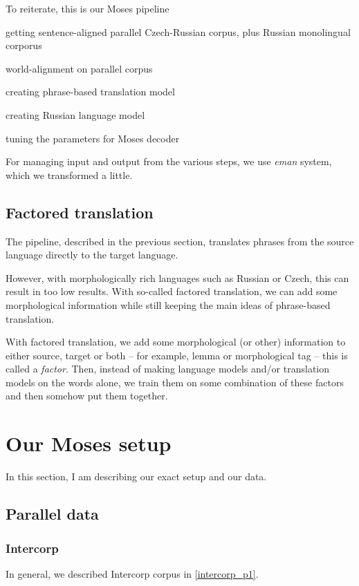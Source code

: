To reiterate, this is our Moses pipeline
\begin{pitemize}
\item getting sentence-aligned parallel Czech-Russian corpus, plus Russian monolingual corporus
\item world-alignment on parallel corpus
\item creating phrase-based translation model
\item creating Russian language model
\item tuning the parameters for Moses decoder
\end{pitemize}

For managing input and output from the various steps, we use \emph{eman} system, which we transformed a little.

\subsection{Factored translation}

The pipeline, described in the previous section, translates phrases from the source language directly to the target language.

However, with morphologically rich languages such as Russian or Czech, this can result in too low results. With so-called factored translation, we can add some morphological information while still keeping the main ideas of phrase-based translation.

With factored translation, we add some morphological (or other) information to either source, target or both -- for example, lemma or morphological tag -- this is called a \emph{factor}. Then, instead of making language models and/or translation models on the words alone, we train them on some combination of these factors and then somehow put them together.


\section{Our Moses setup}
In this section, I am describing our exact setup and our data.

\subsection{Parallel data}
\subsubsection{Intercorp}
In general, we described Intercorp corpus in \ref{intercorp_p1}.


